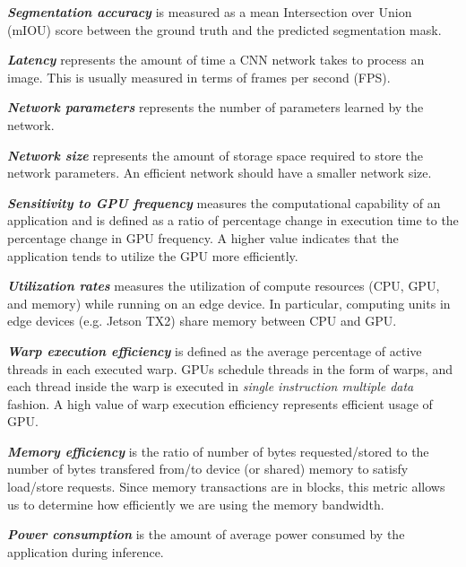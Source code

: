 \documentclass[runningheads]{llncs}
\begin{document}
\noindent \textbf{\textit{Segmentation accuracy}} is measured as a mean Intersection over Union (mIOU) score between the ground truth and the predicted segmentation mask. 


\noindent \textbf{\textit{Latency}} represents the amount of time a CNN network takes to process an image. This is usually measured in terms of frames per second (FPS).

\noindent \textbf{\textit{Network parameters}} represents the number of parameters learned by the network. 

\noindent \textbf{\textit{Network size}} represents the amount of storage space required to store the network parameters. An efficient network should have a smaller network size. 

\noindent \textbf{\textit{Sensitivity to GPU frequency}} measures the computational capability of an application and is defined as a ratio of percentage change in execution time to the percentage change in GPU frequency. A higher value indicates that the application tends to utilize the GPU more efficiently.

\noindent \textbf{\textit{Utilization rates}} measures the utilization of compute resources (CPU, GPU, and memory) while running on an edge device. In particular, computing units in edge devices (e.g. Jetson TX2) share memory between CPU and GPU.

\noindent \textbf{\textit{Warp execution efficiency}} is defined as the average percentage of active threads in each executed warp. GPUs schedule threads in the form of warps, and each thread inside the warp is executed in \textit{single instruction multiple data} fashion. A high value of warp execution efficiency represents efficient usage of GPU.

\noindent \textbf{\textit{Memory efficiency}} is the ratio of number of bytes requested/stored to the number of bytes transfered from/to device (or shared) memory to satisfy load/store requests. Since memory transactions are in blocks, this metric allows us to determine how efficiently we are using the memory bandwidth.

\noindent \textbf{\textit{Power consumption}} is the amount of average power consumed by the application during inference.
\end{document}
